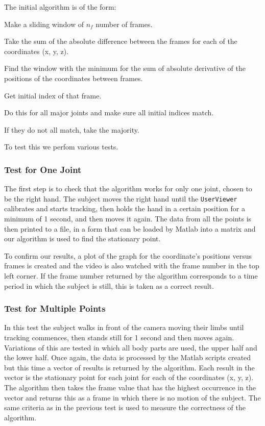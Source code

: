 \documentclass[11pt,a4paper]{article}
\begin{document}
\noindent
The initial algorithm is of the form:
\begin{compactitem}
\setlength{\itemsep}{1pt}
\setlength{\parskip}{0pt}
\setlength{\parsep}{0pt}
	\item Make a sliding window of $n_{f}$ number of frames.
	\item Take the sum of the absolute difference between the frames for each of the coordinates (x, y, z).
	\item Find the window with the minimum for the sum of absolute derivative of the positions of the coordinates between frames.
	\item Get initial index of that frame.
\item Do this for all major joints and make sure all initial indices match.
\item If they do not all match, take the majority. 
\end{compactitem}
\noindent
To test this we perfom various tests.
\subsubsection{Test for One Joint}
The first step is to check that the algorithm works for only one joint, chosen to be the right hand. The subject moves the right hand until the \texttt{UserViewer} calibrates and starts tracking, then holds the hand in a certain position for a minimum of 1 second, and then moves it again. The data from all the points is then printed to a file, in a form that can be loaded by Matlab into a matrix and our algorithm is used to find the stationary point.  

\noindent
To confirm our results, a plot of the graph for the coordinate's positions versus frames is created and the video is also watched with the frame number in the top left corner. If the frame number returned by the algorithm corresponds to a time period in which the subject is still, this is taken as a correct result. 
\subsubsection{Test for Multiple Points}
\noindent 
In this test the subject walks in front of the camera moving their limbs until tracking commences, then stands still for 1 second and then moves again. Variations of this are tested in which all body parts are used, the upper half and the lower half. Once again, the data is processed by the Matlab scripts created but this time a vector of results is returned by the algorithm. Each result in the vector is the stationary point for each joint for each of the coordinates (x, y, z). The algorithm then takes the frame value that has the highest occurrence in the vector and returns this as a frame in which there is no motion of the subject. The same criteria as in the previous test is used to measure the correctness of the algorithm. 
\end{document}
